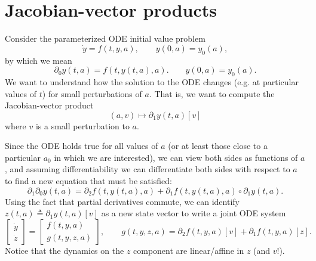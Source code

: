 \documentclass{article}
\begin{document}
\section{Jacobian-vector products}
Consider the parameterized ODE initial value problem
\begin{equation}
    \dot y = f(t, y, a), \qquad y(0, a) = y_0(a),
\end{equation}
by which we mean
\begin{equation}
    \partial_0 y(t, a) = f(t, y(t, a), a). \qquad y(0, a) = y_0(a).
\end{equation}
We want to understand how the solution to the ODE changes (e.g. at particular
values of $t$) for small perturbations of $a$. That is, we want to compute the
Jacobian-vector product
\begin{equation}
    (a, v) \mapsto \partial_1 y(t, a)[v]
\end{equation}
where $v$ is a small perturbation to $a$.

Since the ODE holds true for all values of $a$ (or at least those close to a
particular $a_0$ in which we are interested), we can view both sides as
functions of $a$, and assuming differentiability we can differentiate both
sides with respect to $a$ to find a new equation that must be satisfied:
\begin{equation}
    \partial_1 \partial_0 y(t, a) = \partial_2 f(t, y(t, a), a) + \partial_1 f(t, y(t, a), a) \circ \partial_1 y(t, a).
\end{equation}
Using the fact that partial derivatives commute, we can identify $z(t, a)
\triangleq \partial_1 y(t, a)[v]$ as a new state vector to write a joint ODE system
\begin{equation}
    \begin{bmatrix}
        \dot y \\
        \dot z
    \end{bmatrix}
    =
    \begin{bmatrix}
        f(t, y, a) \\
        g(t, y, z, a)
    \end{bmatrix},
    \qquad
    g(t, y, z, a) = \partial_2 f(t, y, a)[v] + \partial_1 f(t, y, a)[z].
\end{equation}
Notice that the dynamics on the $z$ component are linear/affine in $z$ (and $v$!).

\end{document}
